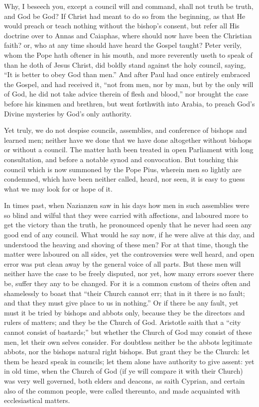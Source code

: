 Why, I beseech you, except a council will and command, shall not
truth be truth, and God be God? If Christ had meant to do so from
the beginning, as that He would preach or teach nothing without the
bishop’s consent, but refer all His doctrine over to Annas and
Caiaphas, where should now have been the Christian faith? or, who at
any time should have heard the Gospel taught? Peter verily, whom
the Pope hath oftener in his mouth, and more reverently useth to speak
of than he doth of Jesus Christ, did boldly stand against the holy council,
saying, “It is better to obey God than men.” And after
Paul had once entirely embraced the Gospel, and had received it, “not
from men, nor by man, but by the only will of God, he did not take advice
therein of flesh and blood,” nor brought the case before his kinsmen
and brethren, but went forthwith into Arabia, to preach God’s
Divine mysteries by God’s only authority.

Yet truly, we do not despise councils, assemblies, and
conference of bishops and learned men; neither have we done that we
have done altogether without bishops or without a council. The
matter hath been treated in open Parliament with long consultation,
and before a notable synod and convocation. But touching this
council which is now summoned by the Pope Pius, wherein men so lightly
are condemned, which have been neither called, heard, nor seen, it is
easy to guess what we may look for or hope of it.

In times past, when Nazianzen saw in his days how men in such assemblies
were so blind and wilful that they were carried with affections, and
laboured more to get the victory than the truth, he pronounced openly
that he never had seen any good end of any council. What would
he say now, if he were alive at this day, and understood the heaving
and shoving of these men? For at that time, though the matter
were laboured on all sides, yet the controversies were well heard, and
open error was put clean away by the general voice of all parts.
But these men will neither have the case to be freely disputed, nor
yet, how many errors soever there be, suffer they any to be changed.
For it is a common custom of theirs often and shamelessly to boast that
“their Church cannot err;
that in it there is no fault; and that they must give place to us in
nothing.” Or if there be any fault, yet must it be tried
by bishops and abbots only, because they be the directors and rulers
of matters; and they be the Church of God. Aristotle saith that
a “city cannot consist of bastards;” but whether the Church
of God may consist of these men, let their own selves consider.
For doubtless neither be the abbots legitimate abbots, nor the bishops
natural right bishops. But grant they be the Church: let them
be heard speak in councils; let them alone have authority to give assent:
yet in old time, when the Church of God (if ye will compare it with
their Church) was very well governed, both elders and deacons, as saith
Cyprian, and certain also of the common people, were called thereunto,
and made acquainted with ecclesiastical matters.

